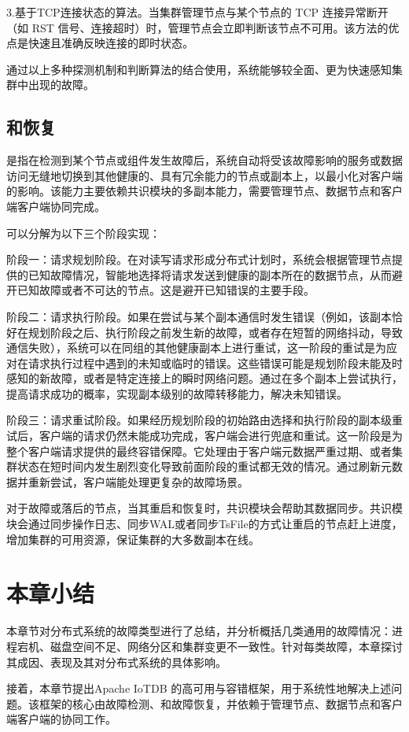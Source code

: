 3.基于TCP连接状态的算法。当集群管理节点与某个节点的 TCP 连接异常断开（如 RST 信号、连接超时）时，管理节点会立即判断该节点不可用。该方法的优点是快速且准确反映连接的即时状态。

通过以上多种探测机制和判断算法的结合使用，系统能够较全面、更为快速感知集群中出现的故障。


\subsection{\failover 和恢复}

\failover 是指在检测到某个节点或组件发生故障后，系统自动将受该故障影响的服务或数据访问无缝地切换到其他健康的、具有冗余能力的节点或副本上，以最小化对客户端的影响。该能力主要依赖共识模块的多副本能力，需要管理节点、数据节点和客户端客户端协同完成。

\failover 可以分解为以下三个阶段实现：

阶段一：请求规划阶段。在对读写请求形成分布式计划时，系统会根据管理节点提供的已知故障情况，智能地选择将请求发送到健康的副本所在的数据节点，从而避开已知故障或者不可达的节点。这是避开已知错误的主要手段。

阶段二：请求执行阶段。如果在尝试与某个副本通信时发生错误（例如，该副本恰好在规划阶段之后、执行阶段之前发生新的故障，或者存在短暂的网络抖动，导致通信失败），系统可以在同组的其他健康副本上进行重试，这一阶段的重试是为应对在请求执行过程中遇到的未知或临时的错误。这些错误可能是规划阶段未能及时感知的新故障，或者是特定连接上的瞬时网络问题。通过在多个副本上尝试执行，提高请求成功的概率，实现副本级别的故障转移能力，解决未知错误。

阶段三：请求重试阶段。如果经历规划阶段的初始路由选择和执行阶段的副本级重试后，客户端的请求仍然未能成功完成，客户端会进行兜底和重试。这一阶段是为整个客户端请求提供的最终容错保障。它处理由于客户端元数据严重过期、或者集群状态在短时间内发生剧烈变化导致前面阶段的重试都无效的情况。通过刷新元数据并重新尝试，客户端能处理更复杂的故障场景。

对于故障或落后的节点，当其重启和恢复时，共识模块会帮助其数据同步。共识模块会通过同步操作日志、同步WAL或者同步TsFile的方式让重启的节点赶上进度，增加集群的可用资源，保证集群的大多数副本在线。


\section{本章小结}

本章节对分布式系统的故障类型进行了总结，并分析概括几类通用的故障情况：进程宕机、磁盘空间不足、网络分区和集群变更不一致性。针对每类故障，本章探讨其成因、表现及其对分布式系统的具体影响。

接着，本章节提出Apache IoTDB 的高可用与容错框架，用于系统性地解决上述问题。该框架的核心由故障检测、\failover 和故障恢复，并依赖于管理节点、数据节点和客户端客户端的协同工作。